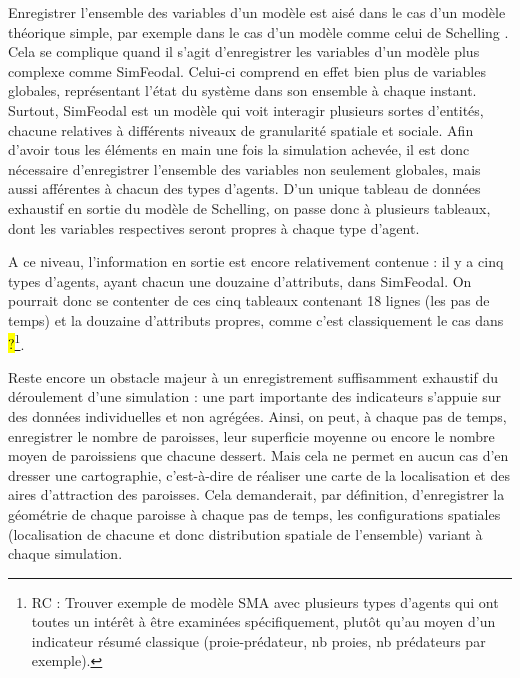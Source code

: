 	Enregistrer l'ensemble des variables d'un modèle est aisé dans le cas d'un modèle théorique simple, par exemple dans le cas d'un modèle comme celui de Schelling \autocite{schelling_dynamic_1971}. Cela se complique quand il s'agit d'enregistrer les variables d'un modèle plus complexe comme SimFeodal.
	Celui-ci comprend en effet bien plus de variables globales, représentant l'état du système dans son ensemble à chaque instant.
	Surtout, SimFeodal est un modèle qui voit interagir plusieurs sortes d'entités, chacune relatives à différents niveaux de granularité spatiale et sociale.
	Afin d'avoir tous les éléments en main une fois la simulation achevée, il est donc nécessaire d'enregistrer l'ensemble des variables non seulement globales, mais aussi afférentes à chacun des types d'agents.
	D'un unique tableau de données exhaustif en sortie du modèle de Schelling, on passe donc à plusieurs tableaux, dont les variables respectives seront propres à chaque type d'agent.

	A ce niveau, l'information en sortie est encore relativement contenue : il y a cinq types d'agents, ayant chacun une douzaine d'attributs, dans SimFeodal. On pourrait donc se contenter de ces cinq tableaux contenant 18 lignes (les pas de temps) et la douzaine d'attributs propres, comme c'est classiquement le cas dans \hl{?}\footnote{
		RC : Trouver exemple de modèle SMA avec plusieurs types d'agents qui ont toutes un intérêt à être examinées spécifiquement, plutôt qu'au moyen d'un indicateur résumé classique (proie-prédateur, nb proies, nb prédateurs par exemple).
	}.

	Reste encore un obstacle majeur à un enregistrement suffisamment exhaustif du déroulement d'une simulation : une part importante des indicateurs s'appuie sur des données individuelles et non agrégées.
	Ainsi, on peut, à chaque pas de temps, enregistrer le nombre de paroisses, leur superficie moyenne ou encore le nombre moyen de paroissiens que chacune dessert.
	Mais cela ne permet en aucun cas d'en dresser une cartographie, c'est-à-dire de réaliser une carte de la localisation et des aires d'attraction des paroisses.
	Cela demanderait, par définition, d'enregistrer la géométrie de chaque paroisse à chaque pas de temps, les configurations spatiales (localisation de chacune et donc distribution spatiale de l'ensemble) variant à chaque simulation.


